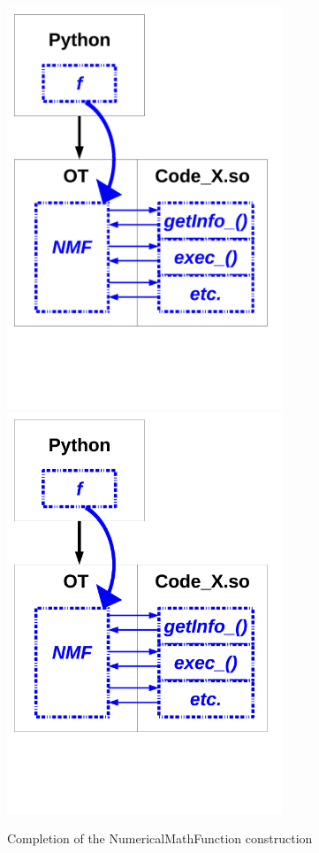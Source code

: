 \begin{figure}
  \begin{center}
    \ifpdf
    \includegraphics[height=12cm]{Figure8.pdf}
    \else
    \includegraphics[height=12cm]{Figure8.png}
    \fi
    \caption[Figure 8]{Completion of the NumericalMathFunction construction}
  \end{center}
\end{figure}

